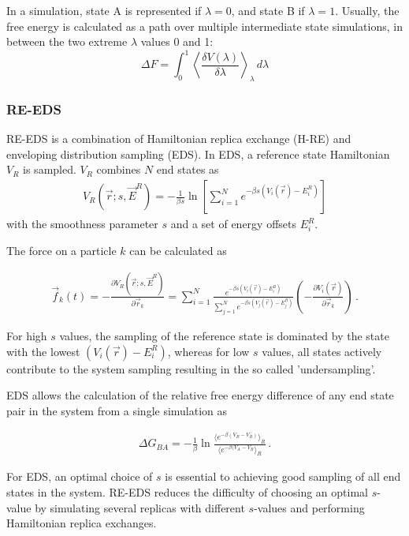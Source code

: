 In a simulation, state A is represented if $\lambda = 0$, and state B if $\lambda = 1$. Usually, the free energy is calculated as a path over multiple intermediate state simulations, in between the two extreme $\lambda$ values 0 and 1:
\begin{equation}
    \Delta F = \int^{1}_{0} \left< \frac{\delta V(\lambda)}{\delta \lambda} \right>_{\lambda} \,d\lambda
    \label{eq: TI-Integration}
\end{equation}

\subsubsection{RE-EDS}
RE-EDS is a combination of Hamiltonian replica exchange (H-RE) and enveloping distribution sampling (EDS).\cite{Hansmann1997,Sugita2000, Christ2007, Sidler2016,Sidler2017,Ries2021} In EDS, a reference state Hamiltonian $V_R$ is sampled.\cite{Christ2007} $V_R$ combines $N$ end states as
\begin{align}
    V_R\left(\vec{r};s,\vec{E}^R\right) = -\frac{1}{\beta s}\ln\left[\sum\limits_{i=1}^N e^{-\beta s\left(V_i(\vec{r})-E_i^R\right)}\right]
\end{align}
with the smoothness parameter $s$ and a set of energy offsets $E_i^R$. 

The force on a particle $k$ can be calculated as \cite{Christ2008}

\begin{align}
    \vec{f}_k(t)=-\frac{\partial V_R(\vec{r}; s, \vec{E}^R)}{\partial \vec{r}_k} = \sum^N_{i=1}\frac{e^{-\beta s(V_i(\vec{r}) -E_i^R)}}{\sum^N_{j=1}{e^{-\beta s (V_j(\vec{r})-E_j^R)}}}  \left( -\frac{\partial V_i(\vec{r})}{\partial \vec{r}_k} \right) \,.
\end{align}

For high $s$ values, the sampling of the reference state is dominated by the state with the lowest $(V_i(\vec{r}) - E_i^R)$, whereas for low $s$ values, all states actively contribute to the system sampling resulting in the so called 'undersampling'. \cite{Riniker2011} 

EDS allows the calculation of the relative free energy difference of any end state pair in the system from a single simulation as

\begin{align}
    \Delta G_{BA} = -\frac{1}{\beta}\ln\frac{\langle e^{-\beta(V_B-V_R)}\rangle_R}{\langle e^{-\beta(V_A-V_R}\rangle_R} \, .
\end{align}

For EDS, an optimal choice of $s$ is essential to achieving good sampling of all end states in the system. RE-EDS reduces the difficulty of choosing an optimal $s$-value by simulating several replicas with different $s$-values and performing Hamiltonian replica exchanges.\cite{Sidler2016}
